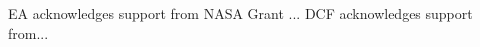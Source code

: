 \documentclass[graybox,natbib,nosecnum]{svmult}
\begin{document}

%


\begin{acknowledgement}
EA acknowledges support from NASA Grant ...  DCF acknowledges support from...
\end{acknowledgement}

\end{document}
